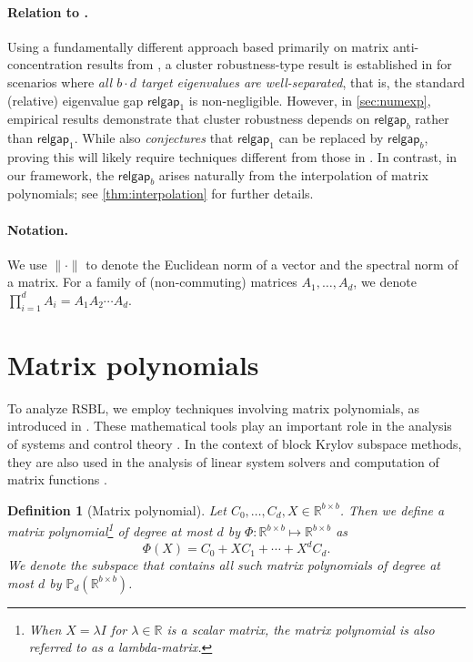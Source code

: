 \documentclass{article}
\newtheorem{definition}{Definition}
\newcommand{\poly}{\mathbb{P}}
\newcommand{\R}{\mathbb{R}}
\newcommand{\gap}{\mathsf{relgap}}
\providecommand{\norm}[1]{\lVert#1\rVert}
\begin{document}
\paragraph{Relation to \cite{Chen2026}.}
Using a fundamentally different approach based primarily on matrix anti-concentration results from \cite{Nie2022}, a cluster robustness-type result is established in \cite[Thm.~4.1]{Chen2026} for scenarios where \emph{all $b\cdot d$ target eigenvalues are well-separated}, that is, the standard (relative) eigenvalue gap $\gap_{1}$ is non-negligible.
However, in \cref{sec:numexp}, empirical results demonstrate that cluster robustness depends on $\gap_{b}$ rather than $\gap_{1}$.
While \cite{Chen2026} also \emph{conjectures} that $\gap_{1}$ can be replaced by $\gap_{b}$, proving this will likely require techniques different from those in \cite{Chen2026}.
In contrast, in our framework, the $\gap_{b}$ arises naturally from the interpolation of matrix polynomials; see \cref{thm:interpolation} for further details.



\paragraph*{Notation.}
We use $\norm{\cdot}$ to denote the Euclidean norm of a vector and the spectral norm of a matrix. For a family of (non-commuting) matrices $A_{1},\dotsc,A_{d}$, we denote $\prod_{i=1}^{d}A_{i} = A_{1}A_{2}\dotsb A_{d}$.



\section{Matrix polynomials}
\label{sec:mplm}
To analyze RSBL, we employ techniques involving matrix polynomials, as introduced in \cite{Dennis1976}. These mathematical tools play an important role in the analysis of systems and control theory \cite{Sontag1998, Lancaster2002}. In the context of block Krylov subspace methods, they are also used in the analysis of linear system solvers \cite{Kubinova2020, Simoncini1996} and computation of matrix functions \cite{Frommer2020}.


\begin{definition}[Matrix polynomial]
    Let $C_{0},\dotsc,C_{d},X\in\R^{b\times b}$. Then we define a matrix polynomial\footnote{When $X=\lambda I$ for $\lambda\in\R$ is a scalar matrix, the matrix polynomial is also referred to as a lambda-matrix.} of degree at most $d$ by $\Phi: \R^{b\times b}\mapsto \R^{b\times b}$ as 
    \begin{equation}
        \label{eq:defPhiX}
        \Phi(X) = C_{0}+XC_{1}+\dotsb+X^{d}C_{d}.
    \end{equation} 
    We denote the subspace that contains all such matrix polynomials of degree at most $d$ by $\poly_{d}(\R^{b\times b})$.
\end{definition}
\end{document}
